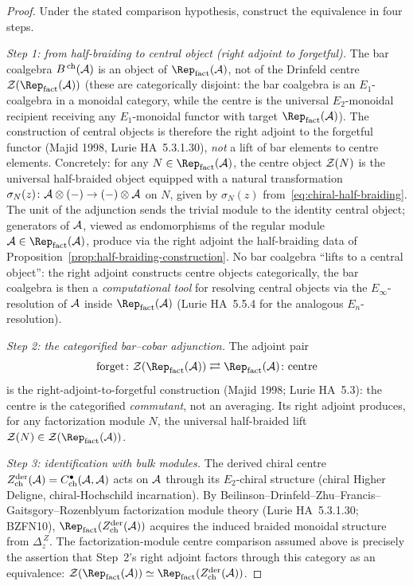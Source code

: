 \begin{proof}
Under the stated comparison hypothesis, construct the equivalence in
four steps.

\emph{Step 1: from half-braiding to central object (right adjoint to
forgetful).} The bar coalgebra $B^{\,\mathrm{ch}}(\mathcal{A})$ is an object
of $\Rep_{\mathrm{fact}}(\cA)$, not of the Drinfeld centre
$\cZ(\Rep_{\mathrm{fact}}(\cA))$ (these are categorically disjoint:
the bar coalgebra is an $E_1$-coalgebra in a monoidal category, while
the centre is the universal $E_2$-monoidal recipient receiving any
$E_1$-monoidal functor with target $\Rep_{\mathrm{fact}}(\cA)$). The
construction of central objects is therefore the right adjoint to the
forgetful functor (Majid 1998, Lurie HA~5.3.1.30), \emph{not} a lift
of bar elements to centre elements. Concretely: for any
$N\in\Rep_{\mathrm{fact}}(\cA)$, the centre object $\mathcal{Z}(N)$ is the
universal half-braided object equipped with a natural transformation
$\sigma_N(z)\colon\mathcal{A}\otimes(-)\to(-)\otimes\mathcal{A}$ on $N$, given by
$\sigma_N(z)$ from~\eqref{eq:chiral-half-braiding}. The unit of the
adjunction sends the trivial module to the identity central object;
generators of $\mathcal{A}$, viewed as endomorphisms of the regular module
$\cA\in\Rep_{\mathrm{fact}}(\cA)$, produce via the right adjoint the
half-braiding data of Proposition~\ref{prop:half-braiding-construction}.
No bar coalgebra ``lifts to a central object'': the right adjoint
constructs centre objects categorically, the bar coalgebra is then a
\emph{computational tool} for resolving central objects via the
$E_\infty$-resolution of $\mathcal{A}$ inside $\Rep_{\mathrm{fact}}(\cA)$
(Lurie HA~5.5.4 for the analogous $E_n$-resolution).

\emph{Step 2: the categorified bar--cobar adjunction.} The adjoint pair
\begin{equation}
 \mathrm{forget}\colon\cZ(\Rep_{\mathrm{fact}}(\cA))\rightleftarrows
 \Rep_{\mathrm{fact}}(\cA)\colon\mathrm{centre}
\end{equation}
is the right-adjoint-to-forgetful construction (Majid 1998;
Lurie HA~5.3): the centre is the categorified \emph{commutant},
not an averaging. Its right adjoint produces, for any
factorization module $N$, the universal half-braided lift
$\cZ(N)\in\cZ(\Rep_{\mathrm{fact}}(\cA))$.

\emph{Step 3: identification with bulk modules.} The derived chiral
centre $Z^{\mathrm{der}}_{\mathrm{ch}}(\mathcal{A})=C^{\bullet}_{\mathrm{ch}}(\mathcal{A},\mathcal{A})$
acts on $\mathcal{A}$ through its $E_2$-chiral structure (chiral Higher
Deligne, chiral-Hochschild incarnation). By
Beilinson--Drinfeld--Zhu--Francis--Gaitsgory--Rozenblyum factorization
module theory (Lurie HA~5.3.1.30; BZFN10),
$\Rep_{\mathrm{fact}}(Z^{\mathrm{der}}_{\mathrm{ch}}(\cA))$ acquires the
induced braided monoidal structure from
$\Delta_z^{\,Z}$. The factorization-module centre comparison assumed
above is precisely the assertion that Step~2's right adjoint factors
through this category as an equivalence:
$\cZ(\Rep_{\mathrm{fact}}(\cA))\simeq
\Rep_{\mathrm{fact}}(Z^{\mathrm{der}}_{\mathrm{ch}}(\cA))$.


\end{proof}
